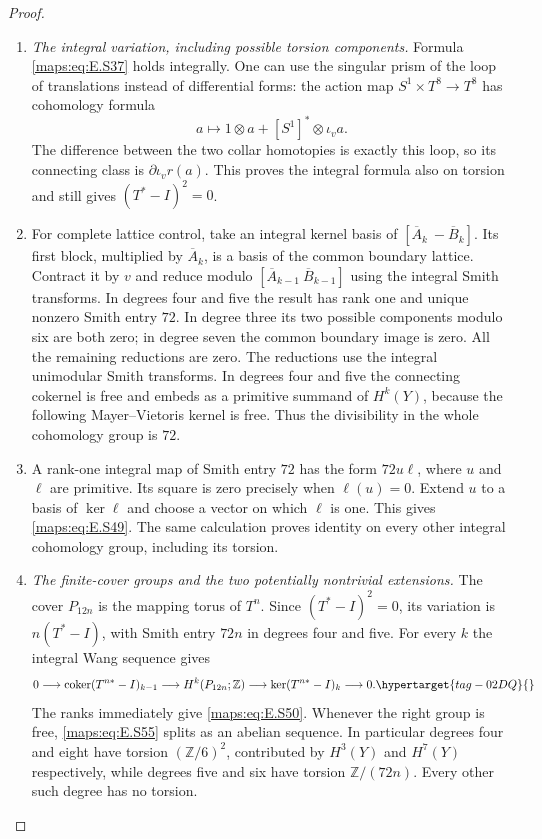 \documentclass[11pt,a4paper]{article}
\numberwithin{equation}{section}
\theoremstyle{definition}
\begin{document}
\begin{proof}
\begin{enumerate}[label=\arabic*.,leftmargin=*]
\item \emph{The integral variation, including possible torsion components.}
Formula \eqref{maps:eq:E.S37} holds integrally. One can use the singular
prism of the loop of translations instead of differential
forms: the action map $S^1\times T^8\to T^8$ has
cohomology formula
\[
 a\longmapsto 1\otimes a+[S^1]^*\otimes\iota_v a.
\]
The difference between the two collar homotopies is
exactly this loop, so its connecting class is
$\partial\iota_v r(a)$. This proves the integral formula
also on torsion and still gives $(T^*-I)^2=0$.

\item For complete lattice control, take an integral kernel
basis of $[\overline A_k\ -\overline B_k]$. Its first
block, multiplied by $\overline A_k$, is a basis of the
common boundary lattice. Contract it by $v$ and reduce
modulo $[\overline A_{k-1}\ \overline B_{k-1}]$ using
the integral Smith transforms. In degrees four and five
the result has rank one and unique nonzero Smith entry
$72$. In degree three its two possible components
modulo six are both zero; in degree seven the common
boundary image is zero. All the remaining reductions
are zero. The reductions use the integral unimodular Smith transforms.
In degrees four and five the connecting cokernel is
free and embeds as a primitive summand of $H^k(Y)$,
because the following Mayer--Vietoris kernel is free.
Thus the divisibility in the whole cohomology group is $72$.

\item A rank-one integral map of Smith entry $72$ has the
form $72u\ell$, where $u$ and $\ell$ are primitive.
Its square is zero precisely when $\ell(u)=0$.
Extend $u$ to a basis of $\ker\ell$ and choose a vector
on which $\ell$ is one. This gives \eqref{maps:eq:E.S49}. The same
calculation proves identity on every other integral
cohomology group, including its torsion.

\item \emph{The finite-cover groups and the two potentially nontrivial extensions.}
The cover $P_{12n}$ is the mapping torus of $T^n$.
Since $(T^*-I)^2=0$, its variation is $n(T^*-I)$,
with Smith entry $72n$ in degrees four and five.
For every $k$ the integral Wang sequence gives
\begin{equation}
 0\longrightarrow\operatorname{coker}(T^{n*}-I)_{k-1}
 \longrightarrow H^k(P_{12n};\mathbb Z)
 \longrightarrow\ker(T^{n*}-I)_k\longrightarrow0.
 \hypertarget{tag-02DQ}{}\label{maps:eq:E.S55}
\end{equation}
The ranks immediately give \eqref{maps:eq:E.S50}. Whenever the right
group is free, \eqref{maps:eq:E.S55} splits as an abelian sequence.
In particular degrees four and eight have torsion
$(\mathbb Z/6)^2$, contributed by $H^3(Y)$ and $H^7(Y)$
respectively, while degrees five and six have torsion
$\mathbb Z/(72n)$. Every other such degree has no torsion.


\end{enumerate}
\end{proof}
\end{document}
